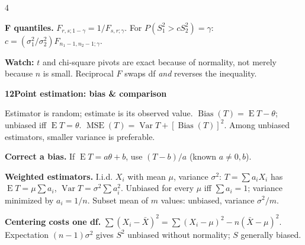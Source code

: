 \documentclass[a4paper,landscape]{article}
\newcommand{\head}[2][late]{\par\vspace{3pt}\noindent\colorbox{#1}{\parbox{\dimexpr\linewidth-6pt}{\color{white}\bfseries #2}}\par\vspace{1pt}}
\newcommand{\cue}[1]{\par\textbf{#1}\enspace}
\newcommand{\trap}[1]{\par{\color{alert}\textbf{Watch:} #1}}
\newcommand{\E}{\operatorname{E}}
\newcommand{\V}{\operatorname{Var}}
\newcommand{\Xb}{\bar X}
\begin{document}
\begin{multicols*}{4}
\cue{F quantiles.} \(F_{r,s;1-\gamma}=1/F_{s,r;\gamma}\). For \(P(S_1^2>cS_2^2)=\gamma\): \(c=(\sigma_1^2/\sigma_2^2)F_{n_1-1,n_2-1;\gamma}\).
\trap{\(t\) and chi-square pivots are exact because of normality, not merely because \(n\) is small. Reciprocal \(F\) swaps df \emph{and} reverses the inequality.}
\head{12\quad Point estimation: bias \& comparison}
Estimator is random; estimate is its observed value.
\(\operatorname{Bias}(T)=\E T-\theta\); unbiased iff \(\E T=\theta\).
\(\operatorname{MSE}(T)=\V T+[\operatorname{Bias}(T)]^2\).
Among unbiased estimators, smaller variance is preferable.
\cue{Correct a bias.} If \(\E T=a\theta+b\), use \((T-b)/a\) (known \(a\ne0,b\)).
\cue{Weighted estimators.} I.i.d. \(X_i\) with mean \(\mu\), variance \(\sigma^2\): \(T=\sum a_iX_i\) has \(\E T=\mu\sum a_i\), \(\V T=\sigma^2\sum a_i^2\). Unbiased for every \(\mu\) iff \(\sum a_i=1\); variance minimized by \(a_i=1/n\). Subset mean of \(m\) values: unbiased, variance \(\sigma^2/m\).
\cue{Centering costs one df.} \(\sum(X_i-\Xb)^2=\sum(X_i-\mu)^2-n(\Xb-\mu)^2\). Expectation \((n-1)\sigma^2\) gives \(S^2\) unbiased without normality; \(S\) generally biased.
\end{multicols*}
\newpage
\end{document}
